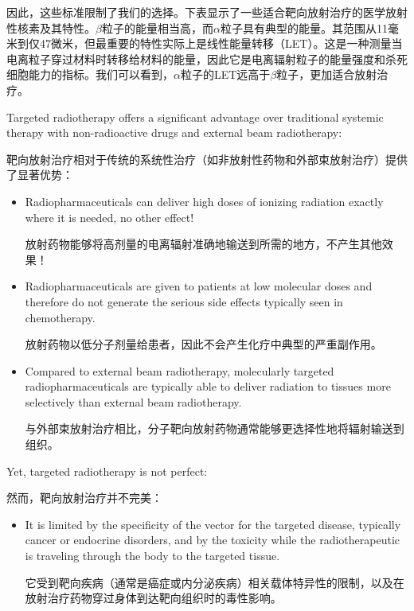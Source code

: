 \documentclass[dvipsnames, svgnames,a4paper,11pt]{article}
\begin{document}
因此，这些标准限制了我们的选择。下表显示了一些适合靶向放射治疗的医学放射性核素及其特性。$\beta$粒子的能量相当高，而$\alpha$粒子具有典型的能量。其范围从11毫米到仅47微米，但最重要的特性实际上是线性能量转移（LET）。这是一种测量当电离粒子穿过材料时转移给材料的能量，因此它是电离辐射粒子的能量强度和杀死细胞能力的指标。我们可以看到，$\alpha$粒子的LET远高于$\beta$粒子，更加适合放射治疗。

Targeted radiotherapy offers a significant advantage over traditional systemic therapy with non-radioactive drugs and external beam radiotherapy:

靶向放射治疗相对于传统的系统性治疗（如非放射性药物和外部束放射治疗）提供了显著优势：
\begin{itemize}
      \item Radiopharmaceuticals can deliver high doses of ionizing radiation exactly where it is needed, no other effect!

            放射药物能够将高剂量的电离辐射准确地输送到所需的地方，不产生其他效果！

      \item Radiopharmaceuticals are given to patients at low molecular doses and therefore do not generate the serious side effects typically seen in chemotherapy.

            放射药物以低分子剂量给患者，因此不会产生化疗中典型的严重副作用。

      \item Compared to external beam radiotherapy,
            molecularly targeted radiopharmaceuticals are typically able to deliver radiation to tissues more selectively than external beam radiotherapy.

            与外部束放射治疗相比，分子靶向放射药物通常能够更选择性地将辐射输送到组织。
\end{itemize}

Yet, targeted radiotherapy is not perfect:

然而，靶向放射治疗并不完美：

\begin{itemize}
      \item It is limited by the specificity of the vector for the targeted disease, typically cancer or endocrine disorders, and by the toxicity while the radiotherapeutic is traveling through the body to the targeted tissue.

            它受到靶向疾病（通常是癌症或内分泌疾病）相关载体特异性的限制，以及在放射治疗药物穿过身体到达靶向组织时的毒性影响。

\end{itemize}
\end{document}
